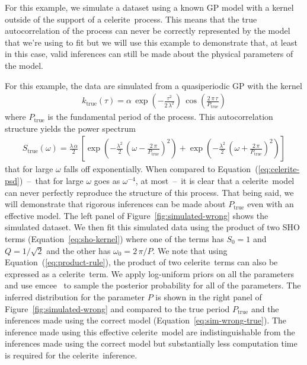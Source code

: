 \documentclass[manuscript, letterpaper]{aastex6}
\makeatletter
\let\origsubsection\subsection
\renewcommand\subsection{\@ifstar{\starsubsection}{\nostarsubsection}}
\newcommand\nostarsubsection[1]{\subsectionprelude\origsubsection{#1}}
\newcommand\starsubsection[1]{\subsectionprelude\origsubsection*{#1}}
\newcommand\subsectionprelude{\vspace{1em}}
\newcommand{\project}[1]{\textsf{#1}}
\newcommand{\celerite}{\project{celerite}}
\newcommand{\emcee}{\project{emcee}}
\newcommand{\figureref}[1]{\ref{fig:#1}}
\newcommand{\Figure}[1]{Figure~\figureref{#1}}
\renewcommand{\eqref}[1]{\ref{eq:#1}}
\newcommand{\Eq}[1]{Equation~(\eqref{#1})}
\newcommand{\eq}[1]{\Eq{#1}}
\newcommand{\eqalt}[1]{Equation~\eqref{#1}}
\newcommand{\eqlabel}[1]{\label{eq:#1}}
\makeatother
\begin{document}
\subsection{Inferences with the ``wrong'' model}

For this example, we simulate a dataset using a known GP model with a kernel
outside of the support of a \celerite\ process.
This means that the true autocorrelation of the process can never be correctly
represented by the model that we're using to fit but we will use this example
to demonstrate that, at least in this case, valid inferences can still be made
about the physical parameters of the model.

For this example, the data are simulated from a quasiperiodic GP with the
kernel
\begin{eqnarray}\eqlabel{sim-wrong-true}
k_\mathrm{true} (\tau) = \alpha\,
    \exp\left(-\frac{\tau^2}{2\,\lambda^2}\right)\,
    \cos\left(\frac{2\,\pi\,\tau}{P_\mathrm{true}}\right)
\end{eqnarray}
where $P_\mathrm{true}$ is the fundamental period of the process.
This autocorrelation structure yields the power spectrum
\begin{eqnarray}
S_\mathrm{true} (\omega) = \frac{\lambda\,\alpha}{2}\,\left[
    \exp\left(-\frac{\lambda^2}{2}\,\left(\omega-
        \frac{2\,\pi}{P_\mathrm{true}}\right)^2\right) +
    \exp\left(-\frac{\lambda^2}{2}\,\left(\omega+
        \frac{2\,\pi}{P_\mathrm{true}}\right)^2\right)
\right]
\end{eqnarray}
that for large $\omega$ falls off exponentially.
When compared to \eq{celerite-psd}~--~that for large $\omega$ goes as
$\omega^{-4}$, at most~--~it is clear that a \celerite\ model can never
perfectly reproduce the structure of this process.
That being said, we will demonstrate that rigorous inferences can be made
about $P_\mathrm{true}$ even with an effective model.
The left panel of \Figure{simulated-wrong} shows the simulated dataset.
We then fit this simulated data using the product of two SHO terms
(\eqalt{sho-kernel}) where one of the terms has $S_0 = 1$ and $Q =
1/\sqrt{2}$ and the other has $\omega_0 = 2\,\pi/P$.
We note that using \eq{product-rule}, the product of two \celerite\ terms can
also be expressed as a \celerite\ term.
We apply log-uniform priors on all the parameters and use \emcee\
\citep{Foreman-Mackey:2013} to sample the posterior probability for all of the
parameters.
The inferred distribution for the parameter $P$ is shown in the right panel of
\Figure{simulated-wrong} and compared to the true period $P_\mathrm{true}$ and
the inferences made using the correct model (\eqalt{sim-wrong-true}).
The inference made using this effective \celerite\ model are indistinguishable
from the inferences made using the correct model but substantially less
computation time is required for the \celerite\ inference.
\end{document}
